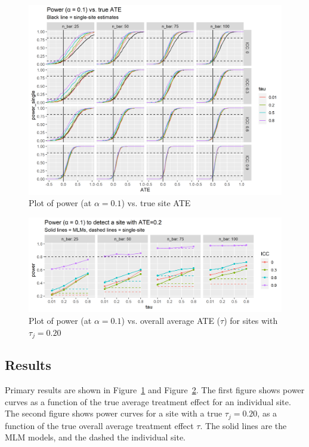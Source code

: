 \documentclass[]{article}
\begin{document}
\begin{figure}[ht]
	\centering
	\includegraphics[width=\textwidth]{power_plot_comp}
	\caption{Plot of power (at $\alpha = 0.1$) vs. true site ATE}
	\label{fig:power_plot}
\end{figure}


\begin{figure}[ht]
	\centering
	\includegraphics[width=\textwidth]{power_plot_comp_ATE02}
	\caption{Plot of power (at $\alpha = 0.1$) vs. overall average ATE ($\tau$) for sites with $\tau_j = 0.20$}
	\label{fig:power_plot_ATE02}
\end{figure}


\subsection{Results}


Primary results are shown in Figure~\ref{fig:power_plot} and Figure~\ref{fig:power_plot_ATE02}.
The first figure shows power curves as a function of the true average treatment effect for an individual site.
The second figure shows power curves for a site with a true $\tau_j = 0.20$, as a function of the true overall average treatment effect $\tau$.
The solid lines are the MLM models, and the dashed the individual site.
\end{document}
